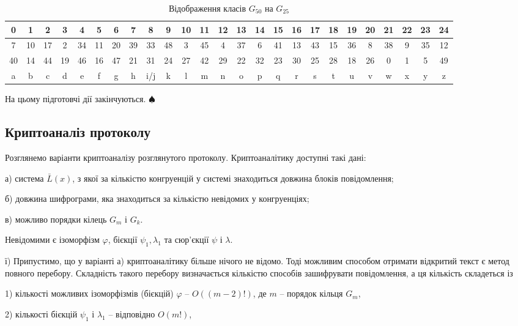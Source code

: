 \documentclass{ceurart}
\begin{document}
{\begin{table}[ht] %
 \centering
 \caption{Відображення класів \(G_{50}\) на \(G_{25}\)} %
 \label{tab:class_mapping}
 \begin{tabular}{ %
 |c@{}|c@{}|c@{}|c@{}|c@{}|c@{}|c@{}|c@{}|c@{}|c@{}|
 c@{}|c@{}|c@{}|c@{}|c@{}|c@{}|c@{}|c@{}|c@{}|c@{}|c@{}|c@{}|c@{}|c@{}|c@{}|}
 \hline
 0&1&2&3&4&5&6&7&8&9&10&11&12&13&14&15&16&17&18&19&20&21&22&23&24\\
 \hline
 7&10&17&2&34&11&20&39&33&48&3&45&4&37&6&41&13&43& 15&36&8&38&9&35&12\\
 40&14&44&19&46&16&47&21&31&24&27&42&29&22&32&23&30&25&28&18&26&0&1& 5&49 \\
 \hline
 a &b &c &d &e&f&g&h&i/j&k&l&m&n&o&p&q&r&s&t&u&v&w&x&y& z\\
 \hline
 \end{tabular}
\end{table}

На цьому підготовчі дії закінчуються. $\spadesuit$
} %

\subsection{Криптоаналіз протоколу}
Розглянемо варіанти криптоаналізу розглянутого протоколу.
Криптоаналітику доступні такі дані:

а) система \(\bar L(x)\), з якої за кількістю конгруенцій у системі
   знаходиться довжина блоків повідомлення;

б) довжина шифрограми, яка знаходиться за кількістю невідомих у
    конгруенціях;

в) можливо порядки кілець \(G_m\) і \(G_k\).

Невідомими є ізоморфізм \(\varphi\), бієкції \(\psi_1, \lambda_1\) та
сюр'єкції \(\psi\) і \(\lambda\).

ї) Припустимо, що у варіанті а) криптоаналітику більше нічого
не відомо. Тоді можливим способом отримати відкритий текст є
метод повного перебору. Складність такого перебору визначається
кількістю способів зашифрувати повідомлення, а ця кількість
складеться із

     1) кількості можливих ізоморфізмів (бієкцій) \(\varphi\)
        -- \(O((m-2)!)\), де \(m\) -- порядок кільця \(G_m\),

     2) кількості бієкцій \(\psi_1\) і \(\lambda_1\) -- відповідно
        \(O(m!)\),
\end{document}
